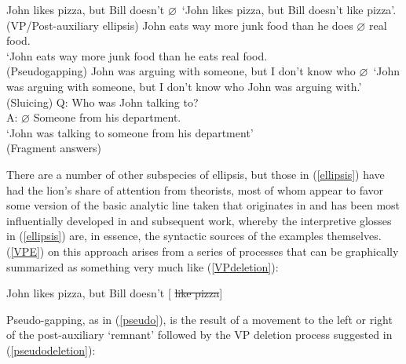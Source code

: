 \documentclass[output=paper,colorlinks,citecolor=brown]{langscibook}
\begin{document}
\begin{exe}
 \ex\label{ellipsis}
  \begin{xlist}
 \ex\label{VPE}
    John likes pizza, but Bill doesn't $\varnothing$\bsl\xspace\
    `John likes pizza, but Bill doesn't like pizza'. \\
    (VP/Post-auxiliary ellipsis)   
 \ex\label{pseudo}
    John eats way more junk food than he does $\varnothing$ real food.\\
    `John eats way more junk food than he eats real food. \\
    (Pseudogapping)
 \ex\label{sluice}
    John was arguing with someone, but I don't know who
  $\varnothing$\bsl\xspace\
    `John was arguing with someone, but I don't know who John was
  arguing with.' \\
    (Sluicing)
 \ex\label{shortans}
   \textsf{Q:} Who was John talking to? \\
   \textsf{A:} $\varnothing$ Someone from his department.\\
   `John was talking to someone from his department'\\
   (Fragment answers)
  \end{xlist}
\end{exe}
There are a number of other subspecies of ellipsis, but those in
(\ref{ellipsis}) have had the lion's share of attention from theorists, most
of whom appear to favor some version of the basic analytic line taken
that originates in \citet{kuno81} and has been most influentially developed
in \citet{merchant01} and subsequent work, whereby the interpretive glosses
in (\ref{ellipsis}) are, in essence, the syntactic sources of the examples
themselves. (\ref{VPE}) on this approach arises from a series of processes
that can be graphically summarized as something very much like
(\ref{VPdeletion}):

\begin{exe}
 \ex\label{VPdeletion}
  John likes pizza, but Bill doesn't [ \sout{like pizza}]
\end{exe}
Pseudo-gapping, as in (\ref{pseudo}), is the result of a movement to the
left or right of the post-auxiliary `remnant' followed by the VP
deletion process suggested in (\ref{pseudodeletion}):
\end{document}
